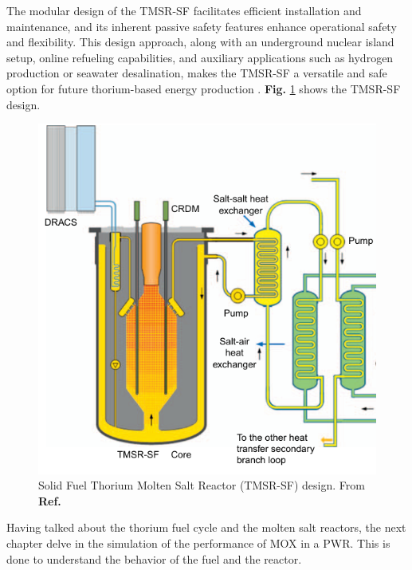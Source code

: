 The modular design of the TMSR-SF facilitates efficient installation and maintenance, and its inherent passive safety features enhance operational safety and flexibility. This design approach, along with an underground nuclear island setup, online refueling capabilities, and auxiliary applications such as hydrogen production or seawater desalination, makes the TMSR-SF a versatile and safe option for future thorium-based energy production \cite{TMSR_book}. \textbf{Fig.} \ref{fig:TMSR-SF} shows the TMSR-SF design. 

\begin{figure}[ht]
    \centering
    \includegraphics[scale=0.5]{Kap6/Figures_Kap6/TMSR-SF.png}
    \caption{Solid Fuel Thorium Molten Salt Reactor (TMSR-SF) design. From \textbf{Ref.} \cite{TMSR_book}}
    \label{fig:TMSR-SF}
\end{figure}

Having talked about the thorium fuel cycle and the molten salt reactors, the next chapter delve in the simulation of the performance of MOX in a PWR. This is done to understand the behavior of the fuel and the reactor.